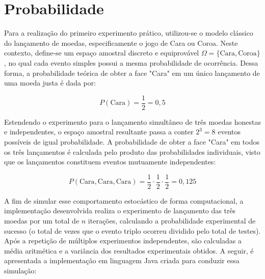 \section{Probabilidade}
\label{cap:probabilidade}

Para a realização do primeiro experimento prático, utilizou-se o modelo clássico do lançamento de moedas, especificamente o jogo de Cara ou Coroa. Neste contexto, define-se um espaço amostral discreto e equiprovável $\Omega = \{\text{Cara}, \text{Coroa}\}$, no qual cada evento simples possui a mesma probabilidade de ocorrência. Dessa forma, a probabilidade teórica de obter a face "Cara" em um único lançamento de uma moeda justa é dada por:

\begin{equation}
    P(\text{Cara}) = \frac{1}{2} = 0{,}5
    \label{eq:probabilidade_simples}
\end{equation}

Estendendo o experimento para o lançamento simultâneo de três moedas honestas e independentes, o espaço amostral resultante passa a conter $2^3 = 8$ eventos possíveis de igual probabilidade. A probabilidade de obter a face "Cara" em todos os três lançamentos é calculada pelo produto das probabilidades individuais, visto que os lançamentos constituem eventos mutuamente independentes:

\begin{equation}
    P(\text{Cara}, \text{Cara}, \text{Cara}) = \frac{1}{2} \cdot \frac{1}{2} \cdot \frac{1}{2} = 0{,}125
    \label{eq:probabilidade_composta}
\end{equation}

A fim de simular esse comportamento estocástico de forma computacional, a implementação desenvolvida realiza o experimento de lançamento das três moedas por um total de $n$ iterações, calculando a probabilidade experimental de sucesso (o total de vezes que o evento triplo ocorreu dividido pelo total de testes). Após a repetição de múltiplos experimentos independentes, são calculadas a média aritmética e a variância dos resultados experimentais obtidos. A seguir, é apresentada a implementação em linguagem Java criada para conduzir essa simulação:




